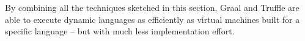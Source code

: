 
By combining all the techniques sketched in this section,
Graal and Truffle are able to execute dynamic languages as efficiently
as virtual machines built for a specific language -- but with much
less implementation effort.
